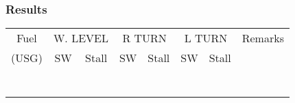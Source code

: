 % 
% 
%
\Large
\subsubsection*{Results}
  \begin{tabularx}{\textwidth}{|c||c|c||c|c||c|c||X|}
    \hline
    Fuel&\multicolumn{2}{c||}{W. LEVEL}&\multicolumn{2}{c||}{R TURN}&\multicolumn{2}{c||}{L TURN}&Remarks\\
    \cline{2-7}
    (USG)&SW&Stall&SW&Stall&SW&Stall&\\
 \hline
 \hline
 &&&&&&&\\
 \hline
 &&&&&&&\\
 \hline
 &&&&&&&\\
 \hline
 &&&&&&&\\
 \hline
 &&&&&&&\\
 \hline
 &&&&&&&\\
 \hline
 &&&&&&&\\
 \hline
 \end{tabularx}     
 \normalsize

